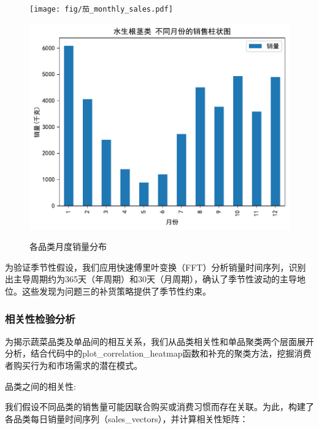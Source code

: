 \documentclass{cumcmthesis} %
\begin{document}
\begin{figure}[H]
    \begin{minipage}[c]{0.45\textwidth}
        \centering
        \texttt{[image: fig/茄\_monthly\_sales.pdf]}
        \label{fig:sample-figure-e}
    \end{minipage}
    \hfill
    \begin{minipage}[c]{0.45\textwidth}
        \centering
        \includegraphics[width=\textwidth]{fig/水生根茎_monthly_sales.pdf}
        \label{fig:sample-figure-f}
    \end{minipage}
    
    \caption{各品类月度销量分布}
    \label{fig:sample-figure}
\end{figure}

为验证季节性假设，我们应用快速傅里叶变换（FFT）分析销量时间序列，识别出主导周期约为365天（年周期）和30天（月周期），确认了季节性波动的主导地位。这些发现为问题三的补货策略提供了季节性约束。


\subsubsection{相关性检验分析}
为揭示蔬菜品类及单品间的相互关系，我们从品类相关性和单品聚类两个层面展开分析，结合代码中的plot\_correlation\_heatmap函数和补充的聚类方法，挖掘消费者购买行为和市场需求的潜在模式。


品类之间的相关性:


我们假设不同品类的销售量可能因联合购买或消费习惯而存在关联。为此，构建了各品类每日销量时间序列（sales\_vectors），并计算相关性矩阵：
\end{document}
